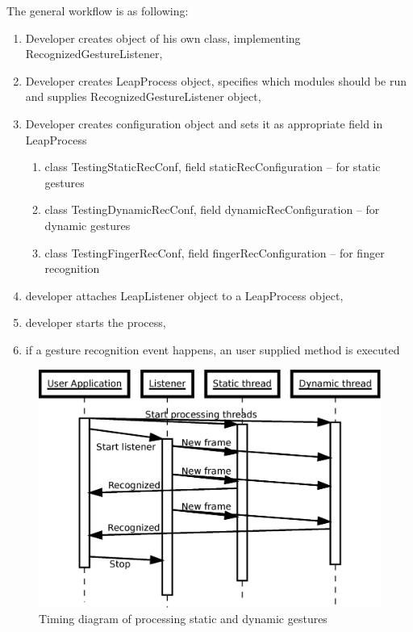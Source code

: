 The general workflow is as following:
\begin{enumerate}
  \item Developer creates object of his own class, implementing RecognizedGestureListener,
  \item Developer creates LeapProcess object, specifies which modules should be run and supplies RecognizedGestureListener object,
  \item Developer creates configuration object and sets it as appropriate field in LeapProcess
  \begin{enumerate}
  	\item class TestingStaticRecConf, field staticRecConfiguration -- for static gestures
  	\item class TestingDynamicRecConf, field dynamicRecConfiguration -- for dynamic gestures
  	\item class TestingFingerRecConf, field fingerRecConfiguration -- for finger recognition
  \end{enumerate}
  \item developer attaches LeapListener object to a LeapProcess object,
  \item developer starts the process,
  \item if a gesture recognition event happens, an user supplied method is executed
\end{enumerate}

\begin{figure}[htb]
\centering
 \includegraphics[width=0.8\columnwidth]{figures/timeline.eps}
 \caption[]{Timing diagram of processing static and dynamic gestures}
 \label{processingtimeline}
\end{figure}

